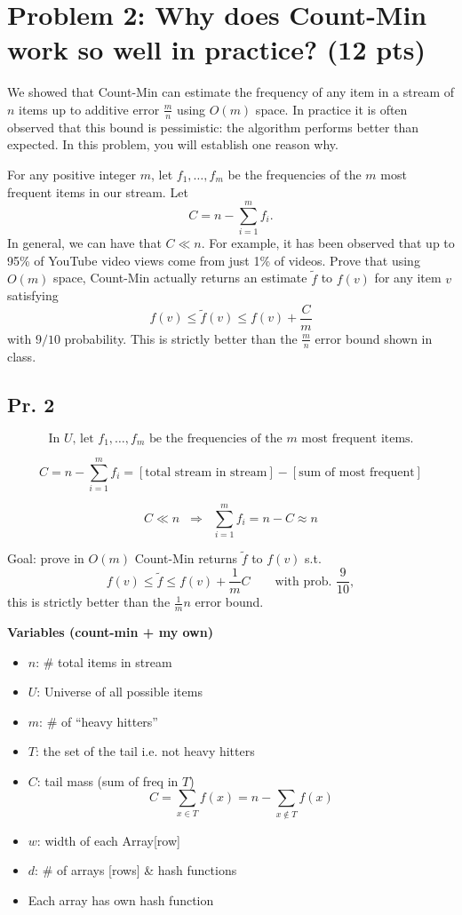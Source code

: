 \documentclass[11pt]{article}
\begin{document}
\section*{Problem 2: Why does Count-Min work so well in practice? (12 pts)}
We showed that Count-Min can estimate the frequency of any item in a stream of $n$ items up to additive error $\tfrac{m}{n}$ using $O(m)$ space. In practice it is often observed that this bound is pessimistic: the algorithm performs better than expected. In this problem, you will establish one reason why.

For any positive integer $m$, let $f_1,\dots,f_m$ be the frequencies of the $m$ most frequent items in our stream. Let
\[ C = n - \sum_{i=1}^m f_i. \]
In general, we can have that $C\ll n$. For example, it has been observed that up to 95\% of YouTube video views come from just 1\% of videos. Prove that using $O(m)$ space, Count-Min actually returns an estimate $\tilde f$ to $f(v)$ for any item $v$ satisfying
\[ f(v) \le \tilde f(v) \le f(v) + \frac{C}{m} \]
with $9/10$ probability. This is strictly better than the $\tfrac{m}{n}$ error bound shown in class.

\subsection*{Pr. 2}

\[
\text{In $U$, let } f_1,\ldots,f_m \text{ be the frequencies of the $m$ most frequent items.}
\]

\[
C = n - \sum_{i=1}^{m} f_i
= [\text{total stream in stream}] - [\text{sum of most frequent}]
\]

\[
C \ll n \;\;\Rightarrow\;\; \sum_{i=1}^{m} f_i = n - C \approx n
\]

Goal: prove in $O(m)$ Count-Min returns $\tilde f$ to $f(v)$ s.t.
\[
f(v) \le \tilde f \le f(v) + \frac{1}{m}C
\qquad \text{with prob. } \frac{9}{10},
\]
this is strictly better than the $\frac{1}{m}n$ error bound.

\bigskip

\textbf{Variables (count-min + my own)}
\begin{itemize}
	\item $n$: \# total items in stream
	\item $U$: Universe of all possible items
	\item $m$: \# of ``heavy hitters''
	\item $T$: the set of the tail i.e. not heavy hitters
	\item $C$: tail mass (sum of freq in $T$)
	\[ C=\sum_{x\in T} f(x) = n - \sum_{x\notin T} f(x) \]
	\item $w$: width of each Array[row] 
	\item $d$: \# of arrays [rows] \& hash functions
	\item[*] Each array has own hash function
\end{itemize}
\end{document}
